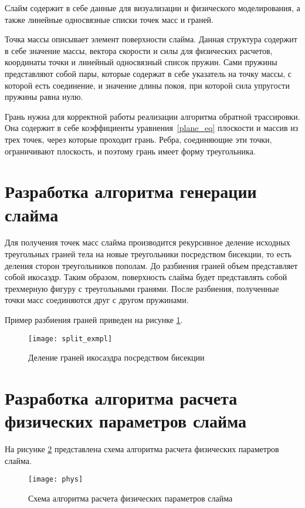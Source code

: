 Слайм содержит в себе данные для визуализации и физического моделирования, а также линейные односвязные списки точек масс и граней.

Точка массы описывает элемент поверхности слайма. Данная структура содержит в себе значение массы, вектора скорости и силы для физических расчетов, координаты точки и линейный односвязный список пружин. Сами пружины представляют собой пары, которые содержат в себе указатель на точку массы, с которой есть соединение, и значение длины покоя, при которой сила упругости пружины равна нулю.

Грань нужна для корректной работы реализации алгоритма обратной трассировки. Она содержит в себе коэффициенты уравнения~\eqref{plane_eq} плоскости и массив из трех точек, через которые проходит грань. Ребра, соединяющие эти точки, ограничивают плоскость, и поэтому грань имеет форму треугольника.

\section{Разработка алгоритма генерации слайма}

Для получения точек масс слайма производится рекурсивное
деление исходных треугольных граней тела на новые треугольники посредством
бисекции, то есть деления сторон треугольников пополам. До разбиения граней
объем представляет собой икосаэдр. Таким образом, поверхность слайма будет представлять собой трехмерную фигуру с треугольными гранями. После разбиения, полученные точки масс соединяются друг с другом пружинами.

Пример разбиения граней приведен на рисунке \ref{split_exmpl}.

\begin{figure}[H]
	\centering
	\texttt{[image: split\_exmpl]}
	\caption{Деление граней икосаэдра посредством бисекции}
	\label{split_exmpl}
\end{figure}

\section{Разработка алгоритма расчета физических параметров слайма}

На рисунке \ref{phys} представлена схема алгоритма расчета физических параметров слайма.

\begin{figure}[H]
	\centering
	\texttt{[image: phys]}
	\caption{Схема алгоритма расчета физических параметров слайма}
	\label{phys}
\end{figure}


